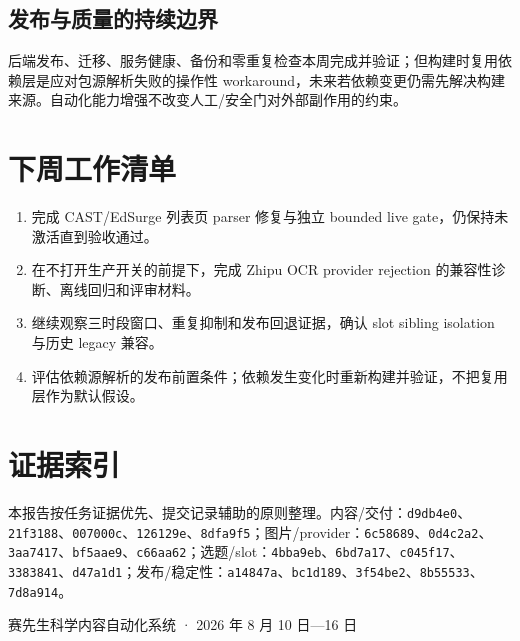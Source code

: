 \documentclass[UTF8,11pt,a4paper,fontset=none]{ctexart}
\begin{document}
\subsection{发布与质量的持续边界}
\begin{infobox}
后端发布、迁移、服务健康、备份和零重复检查本周完成并验证；但构建时复用依赖层是应对包源解析失败的操作性 workaround，未来若依赖变更仍需先解决构建来源。自动化能力增强不改变人工/安全门对外部副作用的约束。
\end{infobox}
\section{下周工作清单}
\begin{enumerate}[leftmargin=2em,itemsep=0.28em]
\item 完成 CAST/EdSurge 列表页 parser 修复与独立 bounded live gate，仍保持未激活直到验收通过。
\item 在不打开生产开关的前提下，完成 Zhipu OCR provider rejection 的兼容性诊断、离线回归和评审材料。
\item 继续观察三时段窗口、重复抑制和发布回退证据，确认 slot sibling isolation 与历史 legacy 兼容。
\item 评估依赖源解析的发布前置条件；依赖发生变化时重新构建并验证，不把复用层作为默认假设。
\end{enumerate}
\section{证据索引}
\small 本报告按任务证据优先、提交记录辅助的原则整理。内容/交付：\texttt{d9db4e0}、\texttt{21f3188}、\texttt{007000c}、\texttt{126129e}、\texttt{8dfa9f5}；图片/provider：\texttt{6c58689}、\texttt{0d4c2a2}、\texttt{3aa7417}、\texttt{bf5aae9}、\texttt{c66aa62}；选题/slot：\texttt{4bba9eb}、\texttt{6bd7a17}、\texttt{c045f17}、\texttt{3383841}、\texttt{d47a1d1}；发布/稳定性：\texttt{a14847a}、\texttt{bc1d189}、\texttt{3f54be2}、\texttt{8b55533}、\texttt{7d8a914}。\par
\vfill\begin{center}\small\sffamily\color{muted}赛先生科学内容自动化系统 · 2026 年 8 月 10 日—16 日\end{center}
\end{document}
